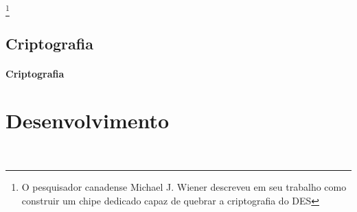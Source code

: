 \documentclass{tcc}
\begin{document}
\footnote{O pesquisador canadense Michael J. Wiener descreveu em seu trabalho como construir um chipe dedicado capaz de quebrar a criptografia do DES}


\section{Criptografia}

\lipsum[50]

\subsubsection{Criptografia}

\lipsum


\lipsum

\chapter{Desenvolvimento}

\lipsum

\postextual 

% 

\end{document}
